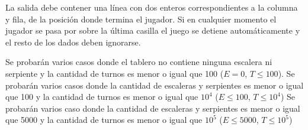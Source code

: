 \documentclass{oci}
\begin{document}
\begin{outputDescription}
  La salida debe contener una línea con dos enteros correspondientes a la
  columna y fila, de la posición donde termina el jugador.
  Si en cualquier momento el jugador se pasa por sobre la última casilla el
  juego se detiene automáticamente y el resto de los dados deben ignorarse.
\end{outputDescription}

\begin{scoreDescription}
   Se probarán varios casos donde el tablero no contiene ninguna
  escalera ni serpiente y la cantidad de turnos es menor o igual que 100
  ($E = 0$, $T \leq 100$).
   Se probarán varios casos donde la cantidad de escaleras y
  serpientes es menor o igual que 100 y la cantidad de turnos es menor o igual
  que $10^4$ ($E \leq 100$, $T \leq 10^4$)
   Se probarán varios caso donde la cantidad de escaleras y serpientes
  es menor o igual que 5000 y la cantidad de turnos es menor o igual que $10^5$
  ($E \leq 5000$, $T \leq 10^5$)
\end{scoreDescription}

\begin{sampleDescription}
\end{sampleDescription}
\end{document}
